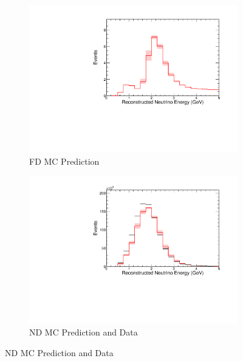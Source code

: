 {\begin{figure}
\end{figure}



\begin{figure}
\begin{center}
\begin{subfigure}[c]{0.49\textwidth}
\includegraphics[width=\textwidth]{figures/systs/prediction/fd_mc_prediction_birksScaleAbs.pdf}
\caption*{FD MC Prediction}
\end{subfigure}
\begin{subfigure}[c]{0.49\textwidth}
\includegraphics[width=\textwidth]{figures/systs/prediction/nd_mc_prediction_birksScaleAbs.pdf}
\caption*{ND MC Prediction and Data}
\end{subfigure}

\vspace{20pt}


\end{center}
\end{figure}}

